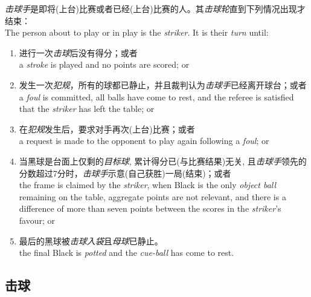 \noindent \emph{击球手}是即将(上台)比赛或者已经(上台)比赛的人。其\emph{击球轮}直到下列情况出现才结束：\\
The person about to play or in play is the \emph{striker}. It is their \emph{turn} until:
\begin{enumerate}[label=(\alph*)]
    \item 进行一次\emph{击球}后没有得分；或者\\
    a \emph{stroke} is played and no points are scored; or
    \item 发生一次\emph{犯规}，所有的球都已静止，并且裁判认为\emph{击球手}已经离开球台；或者\\
    a \emph{foul} is committed, all balls have come to rest, and the referee is satisfied that the \emph{striker} has left the table; or
    \item 在\emph{犯规}发生后，要求对手再次(上台)比赛；或者\\
    a request is made to the opponent to play again following a \emph{foul}; or
    \item 当黑球是台面上仅剩的\emph{目标球}, 累计得分已(与比赛结果)无关, 且\emph{击球手}领先的分数超过7分时，\emph{击球手}示意(自己获胜)一局(结束)；或者\\
    the frame is claimed by the \emph{striker}, when Black is the only \emph{object ball} remaining on the table, aggregate points are not relevant, and there is a difference of more than seven points between the scores in the \emph{striker}'s favour; or
    \item 最后的黑球被\emph{击球入袋}且\emph{母球}已静止。\\
    the final Black is \emph{potted} and the \emph{cue-ball} has come to rest.
\end{enumerate}

\subsection{击球}

